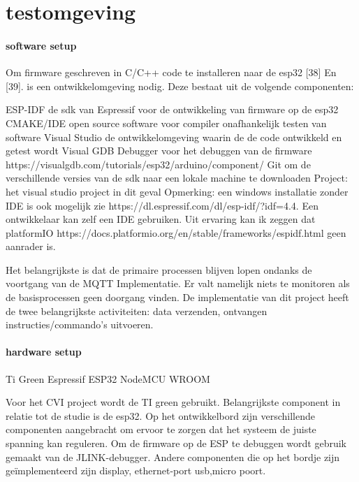 \section{testomgeving}

\paragraph{software setup}


\begin{center}
\end{center}


Om firmware geschreven in C/C++ code te installeren naar de esp32  [38] En  [39].  is een ontwikkelomgeving nodig. Deze bestaat uit de volgende componenten:

ESP-IDF de sdk van Espressif voor de ontwikkeling van firmware op de esp32	
CMAKE/IDE open source software voor compiler onafhankelijk testen van software 	
Visual 	Studio de ontwikkelomgeving waarin de de code ontwikkeld en getest wordt 	
Visual 	GDB Debugger voor het debuggen van de firmware https://visualgdb.com/tutorials/esp32/arduino/component/ 	
Git om de verschillende versies van de sdk naar een lokale machine te downloaden 	
Project: het visual studio project in dit geval
Opmerking: een windows installatie zonder IDE is ook mogelijk zie https://dl.espressif.com/dl/esp-idf/?idf=4.4. Een ontwikkelaar kan zelf een IDE gebruiken. Uit ervaring kan ik zeggen dat platformIO https://docs.platformio.org/en/stable/frameworks/espidf.html geen aanrader is.


Het belangrijkste is dat de primaire processen blijven lopen ondanks de voortgang van de MQTT Implementatie. Er valt namelijk niets te monitoren als de basisprocessen geen doorgang vinden.  De implementatie van dit project heeft de twee belangrijkste activiteiten: data verzenden, ontvangen instructies/commando’s uitvoeren. 


\paragraph{hardware setup}
Ti Green
Espressif ESP32 NodeMCU WROOM

Voor het CVI project wordt de TI green gebruikt. Belangrijkste component in relatie tot de studie is de esp32. Op het ontwikkelbord zijn verschillende componenten aangebracht om ervoor te zorgen dat het systeem de juiste spanning kan reguleren. Om de firmware op de ESP te debuggen wordt gebruik gemaakt van de JLINK-debugger. Andere componenten die op het bordje zijn geïmplementeerd zijn display, ethernet-port usb,micro poort.  

